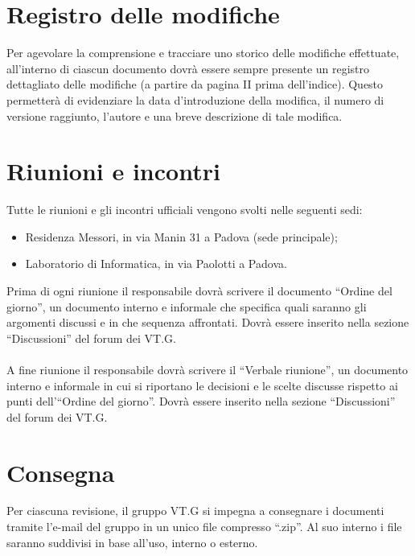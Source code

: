 \chapter{Registro delle modifiche}
\thispagestyle{fancy}
Per agevolare la comprensione e tracciare uno storico delle modifiche
effettuate, all'interno di ciascun documento dovr\`a essere sempre
presente un registro dettagliato delle modifiche (a partire da
pagina II prima dell'indice). Questo permetter\`a di evidenziare la data
d'introduzione della modifica, il numero di versione raggiunto, l'autore e una
breve descrizione di tale modifica.


\chapter{Riunioni e incontri}
\thispagestyle{fancy}
Tutte le riunioni e gli incontri ufficiali vengono svolti nelle seguenti sedi:

\begin{itemize}
\item Residenza Messori, in via Manin 31 a Padova (sede principale);
\item Laboratorio di Informatica, in via Paolotti a Padova.
\end{itemize}

Prima di ogni riunione il responsabile dovr\`a scrivere il documento
``Ordine del giorno'', un documento interno e informale che specifica quali saranno gli
argomenti discussi e in che sequenza affrontati. Dovr\`a essere inserito nella
sezione ``Discussioni'' del forum dei VT.G. \\ \\
A fine riunione il responsabile dovr\`a scrivere il ``Verbale riunione'', un
documento interno e informale in cui si riportano le decisioni e le scelte
discusse rispetto ai punti dell'``Ordine del giorno''. Dovr\`a essere inserito
nella sezione ``Discussioni'' del forum dei VT.G.

\chapter{Consegna}
\thispagestyle{fancy}
Per ciascuna revisione, il gruppo VT.G si impegna a consegnare i documenti
tramite l'e-mail del gruppo in un unico file compresso ``.zip''. Al suo interno i
file saranno suddivisi in base all'uso, interno o esterno.


